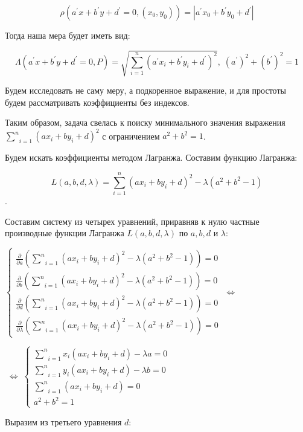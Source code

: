 $$\rho (a^{'}x+b^{'}y+d^{'}=0, (x_0, y_0)) = |a^{'}x_0+b^{'}y_0+d^{'}|$$

Тогда наша мера будет иметь вид:

$$\Lambda (a^{'}x+b^{'}y+d^{'}=0,P)=\sqrt{\sum_{i=1}^{n} (a^{'}x_i+b^{'}y_i+d^{'})^2},\;(a^{'})^2+(b^{'})^2=1$$

Будем исследовать не саму меру, а подкоренное выражение, и для простоты будем рассматривать коэффициенты без индексов.

Таким образом, задача свелась к поиску минимального значения выражения $\underset{i=1}{\overset{n}{\sum}}(ax_i+by_i+d)^2$ с ограничением $a^2+b^2=1$.

Будем искать коэффициенты методом Лагранжа. Составим функцию Лагранжа:

$$L(a, b, d, \lambda) = \underset{i=1}{\overset{n}{\sum}}(ax_i+by_i+d)^2 - \lambda (a^2+b^2-1)$$.

Составим систему из четырех уравнений, приравняв к нулю частные производные функции Лагранжа $L(a, b, d, \lambda)$ по $a, b, d$ и $\lambda$:

\begin{center}
	$\begin{cases}
		\frac{\partial}{\partial a} (\underset{i=1}{\overset{n}{\sum}}(ax_i+by_i+d)^2 - \lambda (a^2+b^2-1)) = 0 \\
		\frac{\partial}{\partial b} (\underset{i=1}{\overset{n}{\sum}}(ax_i+by_i+d)^2 - \lambda (a^2+b^2-1)) = 0 \\
		\frac{\partial}{\partial d} (\underset{i=1}{\overset{n}{\sum}}(ax_i+by_i+d)^2 - \lambda (a^2+b^2-1)) = 0 \\
		\frac{\partial}{\partial \lambda} (\underset{i=1}{\overset{n}{\sum}}(ax_i+by_i+d)^2 - \lambda (a^2+b^2-1)) = 0
	\end{cases} \; \Leftrightarrow \;$
\end{center}

\begin{center}
	$\; \Leftrightarrow \;\begin{cases}
		\underset{i=1}{\overset{n}{\sum}}x_i(ax_i+by_i+d) - \lambda a = 0 \\
		\underset{i=1}{\overset{n}{\sum}}y_i(ax_i+by_i+d) - \lambda b = 0 \\
		\underset{i=1}{\overset{n}{\sum}}(ax_i+by_i+d) = 0 \\
		a^2+b^2 = 1
	\end{cases}$
\end{center}

Выразим из третьего уравнения $d$:

